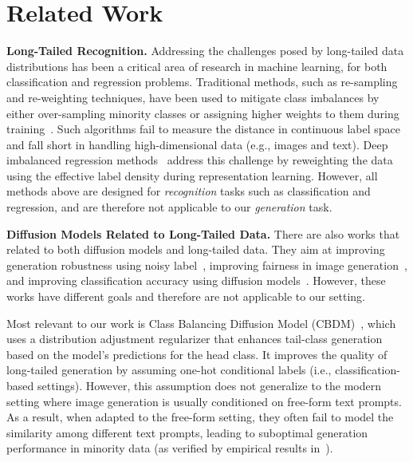 \section{Related Work}
\textbf{Long-Tailed Recognition.} 
Addressing the challenges posed by long-tailed data distributions has been a critical area of research in machine learning, for both classification and regression problems. Traditional methods, such as re-sampling and re-weighting techniques, have been used to mitigate class imbalances by either over-sampling minority classes or assigning higher weights to them during training~\citep{chawla2002smote, he2009learning, torgo2013smote, branco2017smogn, branco2018rebagg}. 
Such algorithms fail to measure the distance in continuous label space and fall short in handling high-dimensional data (e.g., images and text). 
Deep imbalanced regression methods~\cite{yang2021delving,ren2022balanced,gong2022ranksim,keramati2023conr,wang2024variational} address this challenge by reweighting the data using the effective label density during representation learning. 
However, all methods above are designed for \emph{recognition} tasks such as classification and regression, and are therefore not applicable to our \emph{generation} task. 

\textbf{Diffusion Models Related to Long-Tailed Data.} 
There are also works that related to both diffusion models and long-tailed data. They aim at improving generation robustness using noisy label~\cite{na2024label}, improving fairness in image generation~\cite{shen2023finetuning}, and improving classification accuracy using diffusion models~\cite{zhang2024long}. However, these works have different goals and therefore are not applicable to our setting. 

Most relevant to our work is Class Balancing Diffusion Model (CBDM)~\citep{qin2023class}, which uses a distribution adjustment regularizer that enhances tail-class generation based on the model’s predictions for the head class. 
It improves the quality of long-tailed generation by assuming one-hot conditional labels (i.e., classification-based settings). 
However, this assumption does not generalize to the modern setting where image generation is usually conditioned on free-form text prompts. As a result, when adapted to the free-form setting, they often fail to model the similarity among different text prompts, leading to suboptimal generation performance in minority data (as verified by empirical results in~).
